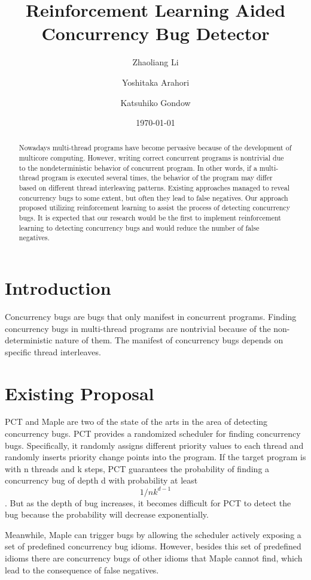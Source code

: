\documentclass[twocolumn]{article}
\title{Reinforcement Learning Aided Concurrency Bug Detector}
\author{Zhaoliang Li
	\and
	Yoshitaka Arahori
	\and
	Katsuhiko Gondow}
\date{\today}
\begin{document}
\maketitle

\begin{abstract}
Nowadays multi-thread programs have become pervasive because of the development of multicore computing. However, writing correct concurrent programs is nontrivial due to the nondeterministic behavior of concurrent program. In other words, if a multi-thread program is executed several times, the behavior of the program may differ based on different thread interleaving patterns. Existing approaches managed to reveal concurrency bugs to some extent, but often they lead to false negatives. Our approach proposed utilizing reinforcement learning to assist the process of detecting concurrency bugs. It is expected that our research would be the first to implement reinforcement learning to detecting concurrency bugs and would reduce the number of false negatives. 
\end{abstract}

\section{Introduction}
Concurrency bugs are bugs that only manifest in concurrent programs. Finding concurrency bugs in multi-thread programs are nontrivial because of the non-deterministic nature of them. The manifest of concurrency bugs depends on specific thread interleaves. 

\section{Existing Proposal}
PCT and Maple are two of the state of the arts in the area of detecting concurrency bugs. PCT provides a randomized scheduler for finding concurrency bugs. Specifically, it randomly assigns different priority values to each thread and randomly inserts priority change points into the program. If the target program is with n threads and k steps, PCT guarantees the probability of finding a concurrency bug of depth d with probability at least \[1/nk^{d-1}\]. But as the depth of bug increases, it becomes difficult for PCT to detect the bug because the probability will decrease exponentially. \par
Meanwhile, Maple can trigger bugs by allowing the scheduler actively exposing a set of predefined concurrency bug idioms. However, besides this set of predefined idioms there are concurrency bugs of other idioms that Maple cannot find, which lead to the consequence of false negatives. 
\end{document}
